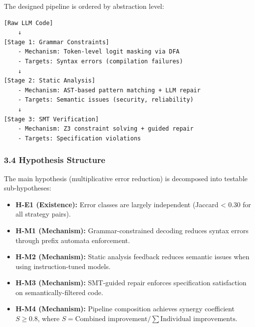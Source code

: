 The designed pipeline is ordered by abstraction level:

\begin{verbatim}
[Raw LLM Code]
    ↓
[Stage 1: Grammar Constraints]
    - Mechanism: Token-level logit masking via DFA
    - Targets: Syntax errors (compilation failures)
    ↓
[Stage 2: Static Analysis]
    - Mechanism: AST-based pattern matching + LLM repair
    - Targets: Semantic issues (security, reliability)
    ↓
[Stage 3: SMT Verification]
    - Mechanism: Z3 constraint solving + guided repair
    - Targets: Specification violations
\end{verbatim}

\subsubsection{3.4 Hypothesis Structure}

The main hypothesis (multiplicative error reduction) is decomposed into testable sub-hypotheses:

\begin{itemize}
\item \textbf{H-E1 (Existence):} Error classes are largely independent (Jaccard < 0.30 for all strategy pairs).
\item \textbf{H-M1 (Mechanism):} Grammar-constrained decoding reduces syntax errors through prefix automata enforcement.
\item \textbf{H-M2 (Mechanism):} Static analysis feedback reduces semantic issues when using instruction-tuned models.
\item \textbf{H-M3 (Mechanism):} SMT-guided repair enforces specification satisfaction on semantically-filtered code.
\item \textbf{H-M4 (Mechanism):} Pipeline composition achieves synergy coefficient $S \geq 0.8$, where $S = \text{Combined improvement} / \sum \text{Individual improvements}$.
\end{itemize}
